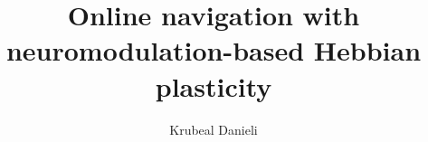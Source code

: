 \documentclass{article}
\begin{document}
\title{Online navigation with neuromodulation-based Hebbian plasticity}
\author{Krubeal Danieli}

\maketitle

\newpage

\tableofcontents

\newpage







\newpage
\newpage



\newpage



\newpage



\newpage


\end{document}
